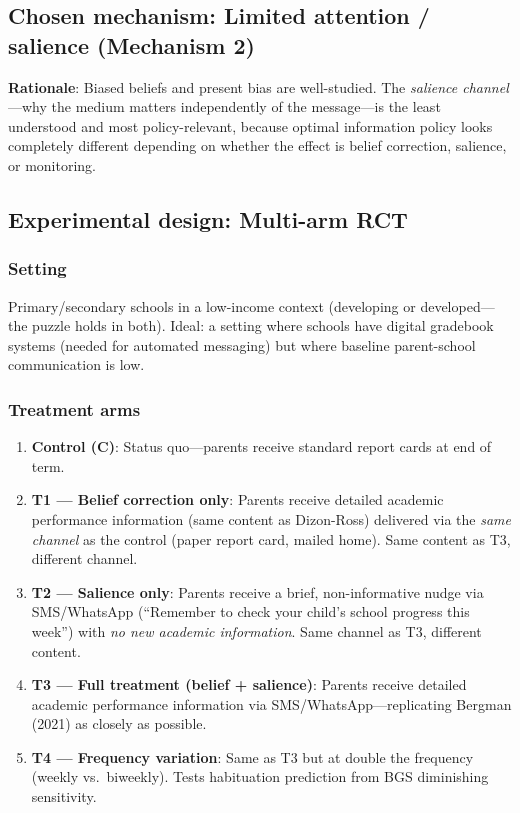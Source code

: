 \documentclass[11pt]{article}
\begin{document}
\subsection{Chosen mechanism: Limited attention / salience (Mechanism 2)}

\textbf{Rationale}: Biased beliefs and present bias are well-studied. The \emph{salience channel}---why the medium matters independently of the message---is the least understood and most policy-relevant, because optimal information policy looks completely different depending on whether the effect is belief correction, salience, or monitoring.

\subsection{Experimental design: Multi-arm RCT}

\subsubsection{Setting}
Primary/secondary schools in a low-income context (developing or developed---the puzzle holds in both). Ideal: a setting where schools have digital gradebook systems (needed for automated messaging) but where baseline parent-school communication is low.

\subsubsection{Treatment arms}
\begin{enumerate}
  \item \textbf{Control (C)}: Status quo---parents receive standard report cards at end of term.
  \item \textbf{T1 --- Belief correction only}: Parents receive detailed academic performance information (same content as Dizon-Ross) delivered via the \emph{same channel} as the control (paper report card, mailed home). Same content as T3, different channel.
  \item \textbf{T2 --- Salience only}: Parents receive a brief, non-informative nudge via SMS/WhatsApp (``Remember to check your child's school progress this week'') with \emph{no new academic information}. Same channel as T3, different content.
  \item \textbf{T3 --- Full treatment (belief + salience)}: Parents receive detailed academic performance information via SMS/WhatsApp---replicating Bergman (2021) as closely as possible.
  \item \textbf{T4 --- Frequency variation}: Same as T3 but at double the frequency (weekly vs.\ biweekly). Tests habituation prediction from BGS diminishing sensitivity.
\end{enumerate}
\end{document}
